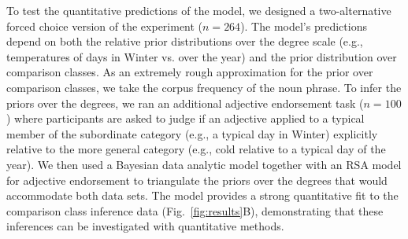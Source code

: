 \documentclass[letterpaper, 12pt]{article}
\begin{document}
To test the quantitative predictions of the model, we designed a two-alternative forced choice version of the experiment ($n=264$). The model's predictions depend on both the relative prior distributions over the degree scale (e.g., temperatures of days in Winter vs. over the year) and the prior distribution over comparison classes. 
As an extremely rough approximation for the prior over comparison classes, we take the corpus frequency of the noun phrase. 
To infer the priors over the degrees, we ran an additional adjective endorsement task ($n=100$) where participants are asked to judge if an adjective applied to a typical member of the subordinate category (e.g., a typical day in Winter) explicitly relative to the more general category (e.g., cold relative to a typical day of the year). 
We then used a Bayesian data analytic model together with an RSA model for adjective endorsement to triangulate the priors over the degrees that would accommodate both data sets.
The model provides a strong quantitative fit to the comparison class inference data (Fig.~\ref{fig:results}B), demonstrating that these inferences can be investigated with quantitative methods.




\end{document}

